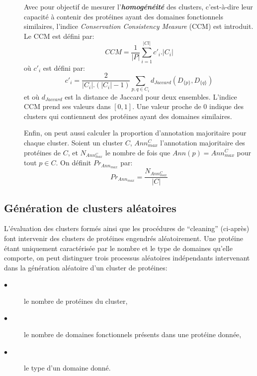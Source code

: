 \begin{description}
\begin{description}
\item[\textbullet] Avec pour objectif de mesurer l'\textit{\textbf{homogénéité}} des clusters, c'est-à-dire leur capacité à contenir des protéines ayant des domaines fonctionnels similaires, l'indice \textit{Conservation Consistency Measure} (CCM) est introduit. Le CCM est défini par:
	\begin{equation}\label{ccm}
		CCM =\frac{1}{|P|}\sum_{i=1}^{|Cl|}c'_{i}.|C_{i}|
	\end{equation}
où $c'_{i}$ est défini par:
	\begin{equation}\label{ccmci}
		c'_{i}=\frac{2}{|C_{i}|.(|C_{i}|-1)}\sum_{p,q \in C_{i}}d_{Jaccard}(D_{\{p\}},D_{\{q\}})
	\end{equation}
et où $d_{Jaccard}$ est la distance de Jaccard pour deux ensembles. L'indice CCM prend ses valeurs dans $[0,1]$. Une valeur proche de 0 indique des clusters qui contiennent des protéines ayant des domaines similaires.\\

\item[\textbullet] Enfin, on peut aussi calculer la proportion d'annotation majoritaire pour chaque cluster. Soient un cluster $C$, $Ann_{max}^{C}$ l'annotation majoritaire des protéines de $C$, et $N_{Ann_{max}^{C}}$ le nombre de fois que $Ann(p)=Ann_{max}^{C}$ pour tout $p \in C$. On définit $Pr_{ Ann_{max}}$ par:
	\begin{equation}\label{eqpourc}
		Pr_{ Ann_{max}}=\frac{N_{Ann_{max}^{C}}}{|C|}
	\end{equation}
\end{description}
\end{description}


      
\subsection{Génération de clusters aléatoires}\label{parclustaleat}
	L'évaluation des clusters formés ainsi que les procédures de “cleaning” (ci-après) font intervenir des clusters de protéines engendrés aléatoirement. Une protéine étant uniquement caractérisée par le nombre et le type de domaines qu'elle comporte, on peut distinguer trois processus aléatoires indépendants intervenant dans la génération aléatoire d'un cluster de protéines:
\begin{description}
	\item[$\bullet$] le nombre de protéines du cluster,
	\item[$\bullet$] le nombre de domaines fonctionnels présents dans une protéine donnée,
	\item[$\bullet$] le type d'un domaine donné.
\end{description}

